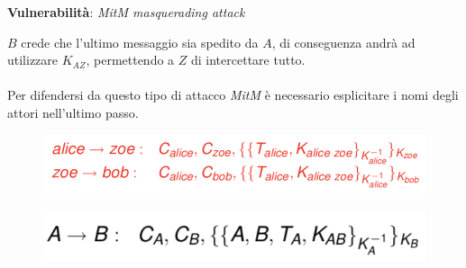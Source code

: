 \documentclass[11pt, a4paper, twoside, italian]{report}
\theoremstyle{plain}
\begin{document}
\noindent
\textbf{Vulnerabilità}: \textit{MitM masquerading attack}
\begin{multicols}{2}
\noindent
$B$ crede che l'ultimo messaggio sia spedito da $A$, di conseguenza andrà ad utilizzare $K_{AZ}$, permettendo a $Z$ di intercettare tutto.\\\\
Per difendersi da questo tipo di attacco \textit{MitM} è necessario esplicitare i nomi degli attori nell'ultimo passo.
\columnbreak
	\begin{figure}[H]
		\centering
		\includegraphics[scale=0.5]{denningsaccomitm}
	\end{figure}
	\begin{figure}[H]
		\centering
		\includegraphics[scale=0.5]{denningsaccomitm2}
	\end{figure}
\end{multicols}
\end{document}
